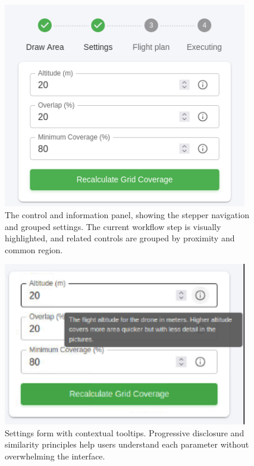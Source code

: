 \begin{figure}[H]
    \centering
    \includegraphics[width=0.95\textwidth]{7. Figures/Frontend/frontend-controls.png}
    \caption{The control and information panel, showing the stepper navigation and grouped settings. The current workflow step is visually highlighted, and related controls are grouped by proximity and common region.}
    \label{fig:frontend-controls}
\end{figure}

\begin{figure}[H]
    \centering
    \includegraphics[width=0.95\textwidth]{7. Figures/Frontend/frontend-tooltips.png}
    \caption{Settings form with contextual tooltips. Progressive disclosure and similarity principles help users understand each parameter without overwhelming the interface.}
    \label{fig:frontend-tooltips}
\end{figure}

